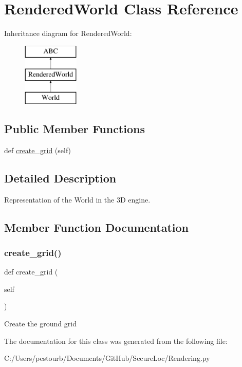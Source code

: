 \hypertarget{class_rendering_1_1_rendered_world}{}\section{Rendered\+World Class Reference}
\label{class_rendering_1_1_rendered_world}
Inheritance diagram for Rendered\+World\+:\begin{figure}[H]
\begin{center}
\leavevmode
\includegraphics[height=3.000000cm]{class_rendering_1_1_rendered_world}
\end{center}
\end{figure}
\subsection*{Public Member Functions}
\begin{DoxyCompactItemize}
\item 
def \mbox{\hyperlink{class_rendering_1_1_rendered_world_a4c41b83d0d7ca78d6aa31cabe4cf0949}{create\+\_\+grid}} (self)
\end{DoxyCompactItemize}


\subsection{Detailed Description}
\begin{DoxyVerb}Representation of the World in the 3D engine.\end{DoxyVerb}
 

\subsection{Member Function Documentation}
\mbox{\label{class_rendering_1_1_rendered_world_a4c41b83d0d7ca78d6aa31cabe4cf0949}} 
\subsubsection{\texorpdfstring{create\+\_\+grid()}{create\_grid()}}
{\footnotesize\ttfamily def create\+\_\+grid (\begin{DoxyParamCaption}\item[{}]{self }\end{DoxyParamCaption})}

\begin{DoxyVerb}Create the ground grid\end{DoxyVerb}
 

The documentation for this class was generated from the following file\+:\begin{DoxyCompactItemize}
\item 
C\+:/\+Users/pestourb/\+Documents/\+Git\+Hub/\+Secure\+Loc/Rendering.\+py\end{DoxyCompactItemize}
